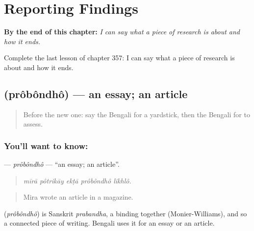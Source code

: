 
\chapter{Reporting Findings}
\label{ch:bn-reporting-findings}

\begin{chapteropening}
\textbf{By the end of this chapter:} \emph{I can say what a piece of research is about and how it ends.}

Complete the last lesson of chapter 357: I can say what a piece of research is about and how it ends.
\end{chapteropening}

\section[\texorpdfstring{\bn{প্রবন্ধ} (prôbôndhô)}{প্রবন্ধ (prôbôndhô)}]{ (prôbôndhô) — an essay; an article}

\label{lesson:BN-C357-probondho}



\begin{quote}
Before the new one: say the Bengali for a yardstick, then the Bengali for to assess.
\end{quote}

\subsection*{You'll want to know: }
\textbf{} — \emph{prôbôndhô} — \textquotedblleft{}an essay; an article\textquotedblright{}.

\begin{quote}
    
\end{quote}

\begin{quote}
\emph{mīrā pôtrikāy ekṭā prôbôndhô likhlô.}
\end{quote}

\begin{quote}
Mira wrote an article in a magazine.
\end{quote}

\begin{cousinweb}
\textbf{} (\emph{prôbôndhô}) is Sanskrit \emph{prabandha}, a binding together (Monier-Williams), and so a connected piece of writing. Bengali uses it for an essay or an article.
\end{cousinweb}

